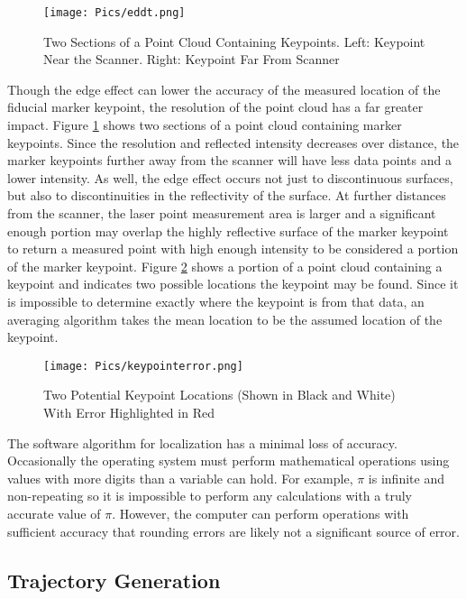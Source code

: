 \begin{figure}
    \centering
    \texttt{[image: Pics/eddt.png]}
    \caption{Two Sections of a Point Cloud Containing Keypoints. Left: Keypoint Near the Scanner. Right: Keypoint Far From Scanner}
    \label{fig:keypointresolution}
\end{figure}

Though the edge effect can lower the accuracy of the measured location of the fiducial marker keypoint, the resolution of the point cloud has a far greater impact. Figure \ref{fig:keypointresolution} shows two sections of a point cloud containing marker keypoints. Since the resolution and reflected intensity decreases over distance, the marker keypoints further away from the scanner will have less data points and a lower intensity. As well, the edge effect occurs not just to discontinuous surfaces, but also to discontinuities in the reflectivity of the surface. At further distances from the scanner, the laser point measurement area is larger and a significant enough portion may overlap the highly reflective surface of the marker keypoint to return a measured point with high enough intensity to be considered a portion of the marker keypoint. Figure \ref{fig:keypointinaccuracy} shows a portion of a point cloud containing a keypoint and indicates two possible locations the keypoint may be found. Since it is impossible to determine exactly where the keypoint is from that data, an averaging algorithm takes the mean location to be the assumed location of the keypoint.\\ 
\begin{figure}
    \centering
    \texttt{[image: Pics/keypointerror.png]}
    \caption{Two Potential Keypoint Locations (Shown in Black and White) With Error Highlighted in Red}
    \label{fig:keypointinaccuracy}
\end{figure}
The software algorithm for localization has a minimal loss of accuracy. Occasionally the operating system must perform mathematical operations using values with more digits than a variable can hold. For example, $\pi$ is infinite and non-repeating so it is impossible to perform any calculations with a truly accurate value of $\pi$. However, the computer can perform operations with sufficient accuracy that rounding errors are likely not a significant source of error.\\

\subsection{Trajectory Generation}

